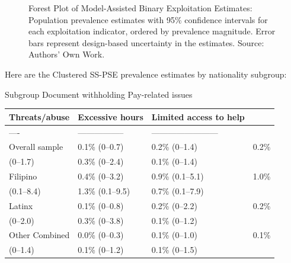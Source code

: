 \documentclass[
  12pt,
  letterpaper,
  DIV=11,
  numbers=noendperiod]{scrartcl}
\theoremstyle{plain}
\theoremstyle{definition}
\begin{document}
\begin{figure}[H]


\caption{\label{fig-ma-binary-forest}Forest Plot of Model-Assisted
Binary Exploitation Estimates: Population prevalence estimates with 95\%
confidence intervals for each exploitation indicator, ordered by
prevalence magnitude. Error bars represent design-based uncertainty in
the estimates. Source: Authors' Own Work.}

\end{figure}%

Here are the Clustered SS-PSE prevalence estimates by nationality
subgroup:

Subgroup \textbar{} Document withholding \textbar{} Pay-related issues
\textbar{}\\

\begin{longtable}[]{@{}llll@{}}
\toprule\noalign{}
Threats/abuse & Excessive hours & Limited access to help & \\
\midrule\noalign{}
\endhead
\bottomrule\noalign{}
\endlastfoot
---- & ----------------- & ------------------------ & \\
Overall sample & 0.1\% (0--0.7) & 0.2\% (0--1.4) & 0.2\% \\
(0--1.7) & 0.3\% (0--2.4) & 0.1\% (0--1.4) & \\
Filipino & 0.4\% (0--3.2) & 0.9\% (0.1--5.1) & 1.0\% \\
(0.1--8.4) & 1.3\% (0.1--9.5) & 0.7\% (0.1--7.9) & \\
Latinx & 0.1\% (0--0.8) & 0.2\% (0--2.2) & 0.2\% \\
(0--2.0) & 0.3\% (0--3.8) & 0.1\% (0--1.2) & \\
Other Combined & 0.0\% (0--0.3) & 0.1\% (0--1.0) & 0.1\% \\
(0--1.4) & 0.1\% (0--1.2) & 0.1\% (0--1.5) & \\
\end{longtable}
\end{document}
